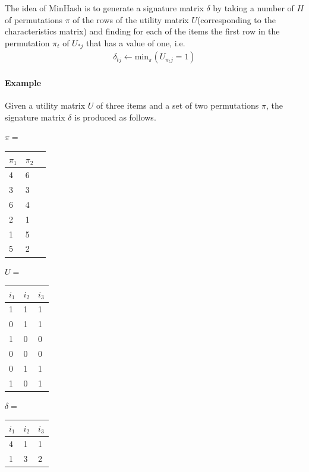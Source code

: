 The idea of MinHash is to generate a signature matrix $\delta$ by taking a number of $H$ of permutations $\pi$ of the rows of the utility matrix $U$(corresponding to the characteristics matrix) and finding for each of the items the first row in the permutation $\pi_t$ of $U_{*j}$ that has a value of one, i.e.
\begin{equation}
\begin{aligned}
\delta_{tj} \gets \text{min}_\pi (U_{\pi_tj} = 1)
\end{aligned}
\end{equation}



\paragraph{Example} Given a utility matrix $U$ of three items and a set of two permutations $\pi$, the signature matrix $\delta$ is produced as follows. 

\vspace{1em}
\begin{minipage}{0.3\linewidth}
    \centering
    $\pi=$
    \begin{tabular}{|l|l|l|}
    \hline
        \textbf{$\pi_1$} & \textbf{$\pi_2$} \\ \hline
        4 & 6 \\ \hline
        3 & 3 \\ \hline
        6 & 4 \\ \hline
        2 & 1 \\ \hline
        1 & 5 \\ \hline
        5 & 2 \\ \hline
    \end{tabular}
\end{minipage}
\begin{minipage}{0.3\linewidth}
    \centering
    $U=$
    \begin{tabular}{|l|l|l|}
    \hline
        \textbf{$i_1$} & \textbf{$i_2$} & \textbf{$i_3$} \\ \hline
        1 & 1 & 1 \\ \hline
        0 & 1 & 1 \\ \hline
        1 & 0 & 0 \\ \hline
        0 & 0 & 0 \\ \hline
        0 & 1 & 1 \\ \hline
        1 & 0 & 1 \\ \hline
    \end{tabular}
\end{minipage}
\begin{minipage}{0.3\linewidth}
    \centering
    $\delta = $
    \begin{tabular}{|l|l|l|}
    \hline
        \textbf{$i_1$} & \textbf{$i_2$} & \textbf{$i_3$} \\ \hline
        4 & 1 & 1 \\ \hline
        1 & 3 & 2 \\ \hline
    \end{tabular}
\end{minipage}


